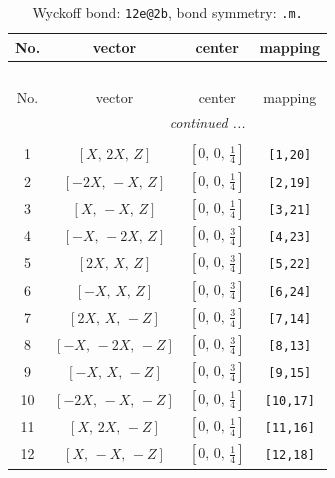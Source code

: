 \documentclass[fleqn,8pt]{jsarticle}
\begin{document}
\renewcommand{\arraystretch}{1.2}
\begin{longtable}{cccc}
\caption{Wyckoff bond: {\tt 12e@2b}, bond symmetry: {\tt .m.}}
 \\
 \hline \hline
No. & vector & center & mapping \\ \hline \endfirsthead

\multicolumn{3}{l}{\tablename\ \thetable{}} \\
 \hline \hline
No. & vector & center & mapping \\ \hline \endhead

 \hline \hline
\multicolumn{3}{r}{\footnotesize\it continued ...} \\ \endfoot

 \hline \hline
\multicolumn{3}{r}{} \\ \endlastfoot

1 & $\left[ X,\, 2 X,\, Z \right]$ & $\left[ 0,\, 0,\, \frac{1}{4} \right]$ & {\tt [1,20]} \\ \hline
2 & $\left[ - 2 X,\, - X,\, Z \right]$ & $\left[ 0,\, 0,\, \frac{1}{4} \right]$ & {\tt [2,19]} \\ \hline
3 & $\left[ X,\, - X,\, Z \right]$ & $\left[ 0,\, 0,\, \frac{1}{4} \right]$ & {\tt [3,21]} \\ \hline
4 & $\left[ - X,\, - 2 X,\, Z \right]$ & $\left[ 0,\, 0,\, \frac{3}{4} \right]$ & {\tt [4,23]} \\ \hline
5 & $\left[ 2 X,\, X,\, Z \right]$ & $\left[ 0,\, 0,\, \frac{3}{4} \right]$ & {\tt [5,22]} \\ \hline
6 & $\left[ - X,\, X,\, Z \right]$ & $\left[ 0,\, 0,\, \frac{3}{4} \right]$ & {\tt [6,24]} \\ \hline
7 & $\left[ 2 X,\, X,\, - Z \right]$ & $\left[ 0,\, 0,\, \frac{3}{4} \right]$ & {\tt [7,14]} \\ \hline
8 & $\left[ - X,\, - 2 X,\, - Z \right]$ & $\left[ 0,\, 0,\, \frac{3}{4} \right]$ & {\tt [8,13]} \\ \hline
9 & $\left[ - X,\, X,\, - Z \right]$ & $\left[ 0,\, 0,\, \frac{3}{4} \right]$ & {\tt [9,15]} \\ \hline
10 & $\left[ - 2 X,\, - X,\, - Z \right]$ & $\left[ 0,\, 0,\, \frac{1}{4} \right]$ & {\tt [10,17]} \\ \hline
11 & $\left[ X,\, 2 X,\, - Z \right]$ & $\left[ 0,\, 0,\, \frac{1}{4} \right]$ & {\tt [11,16]} \\ \hline
12 & $\left[ X,\, - X,\, - Z \right]$ & $\left[ 0,\, 0,\, \frac{1}{4} \right]$ & {\tt [12,18]} \\
\end{longtable}
\end{document}
